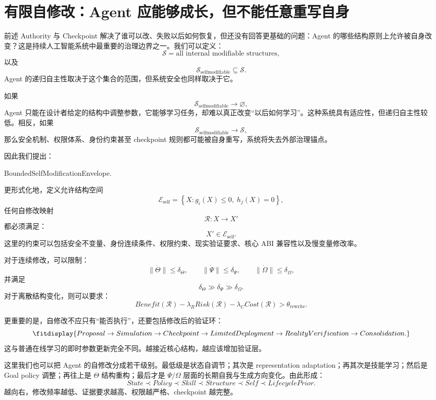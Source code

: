 \section{有限自修改：Agent 应能够成长，但不能任意重写自身}

前述 Authority 与 Checkpoint 解决了谁可以改、失败以后如何恢复，但还没有回答更基础的问题：Agent 的哪些结构原则上允许被自身改变？这是持续人工智能系统中最重要的治理边界之一。我们可以定义：
\[
\mathcal S
=
\text{all internal modifiable structures},
\]
以及
\[
\boxed{
\mathcal S_{\mathrm{selfmodifiable}}
\subseteq
\mathcal S.
}
\]
Agent 的递归自主性取决于这个集合的范围，但系统安全也同样取决于它。

如果
\[
\mathcal S_{\mathrm{selfmodifiable}}
\rightarrow\varnothing,
\]
Agent 只能在设计者给定的结构中调整参数，它能够学习任务，却难以真正改变``以后如何学习''。这种系统具有适应性，但递归自主性较低。相反，如果
\[
\mathcal S_{\mathrm{selfmodifiable}}
\rightarrow\mathcal S,
\]
那么安全机制、权限体系、身份约束甚至 checkpoint 规则都可能被自身重写，系统将失去外部治理锚点。

因此我们提出：
\begin{statementbox}
BoundedSelfModificationEnvelope.
\end{statementbox}
更形式化地，定义允许结构空间
\[
\mathcal E_{\mathrm{self}}
=
\left\{
X:
g_i(X)\leq0,\;
h_j(X)=0
\right\},
\]
任何自修改映射
\[
\mathcal R:X\rightarrow X'
\]
都必须满足：
\[
X'\in\mathcal E_{\mathrm{self}}.
\]
这里的约束可以包括安全不变量、身份连续条件、权限约束、现实验证要求、核心 ABI 兼容性以及慢变量修改率。

对于连续修改，可以限制：
\[
\|\dot{\Theta}\|
\leq
\delta_\Theta,
\qquad
\|\dot{\Psi}\|
\leq
\delta_\Psi,
\qquad
\|\dot{\Omega}\|
\leq
\delta_\Omega,
\]
并满足
\[
\delta_\Theta
\gg
\delta_\Psi
\gg
\delta_\Omega.
\]
对于离散结构变化，则可以要求：
\[
Benefit(\mathcal R)
-
\lambda_R Risk(\mathcal R)
-
\lambda_C Cost(\mathcal R)
>
\theta_{\mathrm{rewrite}}.
\]

更重要的是，自修改不应只有``能否执行''，还要包括修改后的验证环：
\[
\fitdisplay{
Proposal
\rightarrow
Simulation
\rightarrow
Checkpoint
\rightarrow
LimitedDeployment
\rightarrow
RealityVerification
\rightarrow
Consolidation.
}
\]
这与普通在线学习的即时参数更新完全不同。越接近核心结构，越应该增加验证层。

这里我们也可以把 Agent 的自修改分成若干级别。最低级是状态自调节；其次是 representation adaptation；再其次是技能学习；然后是 Goal policy 调整；再往上是 $\Theta$ 结构重构；最后才是 $\Psi/\Omega$ 层面的长期自我与生成方向变化。由此形成：
\[
\boxed{
State
\prec
Policy
\prec
Skill
\prec
Structure
\prec
Self
\prec
LifecyclePrior.
}
\]
越向右，修改频率越低、证据要求越高、权限越严格、checkpoint 越完整。

